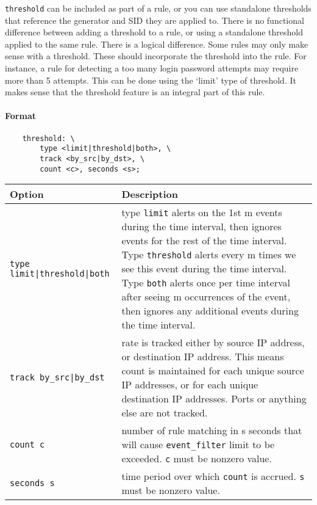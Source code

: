 \documentclass[english]{report}
\begin{document}
\texttt{threshold} can be included as part of a rule, or you can use standalone
thresholds that reference the generator and SID they are applied to. There is
no functional difference between adding a threshold to a rule, or using a
standalone threshold applied to the same rule.   There is a logical difference.
Some rules may only make sense with a threshold.  These should incorporate the
threshold into the rule.  For instance, a rule for detecting a too many login
password attempts may require more than 5 attempts.  This can be done using the
`limit' type of threshold.  It makes sense that the threshold feature is an
integral part of this rule.

\paragraph{Format}

\begin{verbatim}
    threshold: \
        type <limit|threshold|both>, \
        track <by_src|by_dst>, \
        count <c>, seconds <s>;
\end{verbatim}

\begin{table}[h]
\begin{center}
\begin{tabular}{| l | p{4.5in} |}

\hline
\textbf{Option} & \textbf{Description}\\
\hline

\hline
\texttt{type limit|threshold|both} &

type \texttt{limit} alerts on the 1st m events during the time interval, then
ignores events for the rest of the time interval.  Type \texttt{threshold}
alerts every m times we see this event during the time interval.  Type
\texttt{both} alerts once per time interval after seeing m occurrences of the
event, then ignores any additional events during the time interval.\\

\hline
\texttt{track by\_src|by\_dst} &

rate is tracked either by source IP address, or destination IP address.  This
means count is maintained for each unique source IP addresses, or for each
unique destination IP addresses.  Ports or anything else are not tracked.\\

\hline
\texttt{count c} &

number of rule matching in s seconds that will cause \texttt{event\_filter}
limit to be exceeded.  \texttt{c} must be nonzero value.\\

\hline
\texttt{seconds s} &

time period over which \texttt{count} is accrued.  \texttt{s} must be nonzero
value.\\

\hline
\end{tabular}
\end{center}
\end{table}
\end{document}

